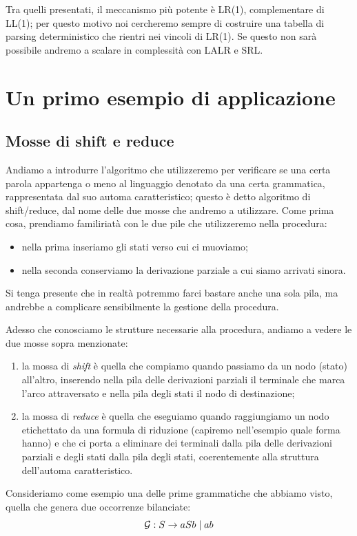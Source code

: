\documentclass[class=book, crop=false, oneside, 12pt]{standalone}
\begin{document}
Tra quelli presentati, il meccanismo più potente è LR(1), complementare di LL(1); per questo motivo noi cercheremo sempre di costruire una tabella di parsing deterministico che rientri nei vincoli di LR(1). Se questo non sarà possibile andremo a scalare in complessità con LALR e SRL.

\section{Un primo esempio di applicazione}
\subsection{Mosse di shift e reduce}
Andiamo a introdurre l'algoritmo che utilizzeremo per verificare se una certa parola appartenga o meno al linguaggio denotato da una certa grammatica, rappresentata dal suo automa caratteristico; questo è detto algoritmo di shift/reduce, dal nome delle due mosse che andremo a utilizzare. Come prima cosa, prendiamo familiriatà con le due pile che utilizzeremo nella procedura:
\begin{itemize}
    \item nella prima inseriamo gli stati verso cui ci muoviamo;
    \item nella seconda conserviamo la derivazione parziale a cui siamo arrivati sinora.
\end{itemize}
Si tenga presente che in realtà potremmo farci bastare anche una sola pila, ma andrebbe a complicare sensibilmente la gestione della procedura.

Adesso che conosciamo le strutture necessarie alla procedura, andiamo a vedere le due mosse sopra menzionate:
\begin{enumerate}
    \item la mossa di \emph{shift} è quella che compiamo quando passiamo da un nodo (stato) all'altro, inserendo nella pila delle derivazioni parziali il terminale che marca l'arco attraversato e nella pila degli stati il nodo di destinazione;
    \item la mossa di \emph{reduce} è quella che eseguiamo quando raggiungiamo un nodo etichettato da una formula di riduzione (capiremo nell'esempio quale forma hanno) e che ci porta a eliminare dei terminali dalla pila delle derivazioni parziali e degli stati dalla pila degli stati, coerentemente alla struttura dell'automa caratteristico.
\end{enumerate}
Consideriamo come esempio una delle prime grammatiche che abbiamo visto, quella che genera due occorrenze bilanciate:
\begin{equation}
    \label{balanced}
    \mathcal{G}: S \to aSb \mid ab
\end{equation}
\end{document}
